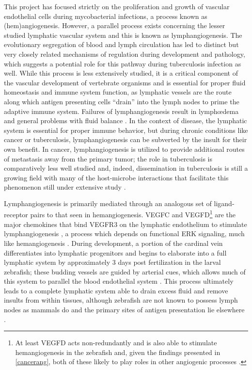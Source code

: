 This project has focused strictly on the proliferation and growth of vascular endothelial cells during mycobacterial infections, a process known as (hem)angiogenesis. However, a parallel process exists concerning the lesser studied lymphatic vascular system and this is known as lymphangiogenesis. The evolutionary segregation of blood and lymph circulation has led to distinct but very closely related mechanisms of regulation during development and pathology, which suggests a potential role for this pathway during tuberculosis infection as well. While this process is less extensively studied, it is a critical component of the vascular development of vertebrate organisms and is essential for proper fluid homeostasis and immune system function, as lymphatic vessels are the route along which antigen presenting cells ``drain'' into the lymph nodes to prime the adaptive immune system. Failures of lymphangiogenesis result in lymph\oe dema and general problems with fluid balance \citep{Makinen2001}. In the context of disease, the lymphatic system is essential for proper immune behavior, but during chronic conditions like cancer or tuberculosis, lymphangiogenesis can be subverted by the insult for their own benefit. In cancer, lymphangiogenesis is utilized to provide additional routes of metastasis away from the primary tumor; the role in tuberculosis is comparatively less well studied \citep{Huang2010, Augustin2009, Duong2012, Stacker2014} and, indeed, dissemination in tuberculosis is still a growing field with many of the host-microbe interactions that facilitate this phenomenon still under extensive study \citep{Saelens2022}.

Lymphangiogenesis is primarily mediated through an analogous set of ligand\hyp{}receptor pairs to that seen in hemangiogenesis. VEGFC and VEGFD\footnote{At least VEGFD acts non\hyp{}redundantly and is also able to stimulate hemangiogenesis in the zebrafish and, given the findings presented in \autoref{cancerang}, both of these likely to play roles in other angiogenic processes \citep{Bower2017a}.} are the major  chemokines that bind VEGFR3 on the lymphatic endothelium to stimulate lymphangiogenesis \citep{Alitalo2005, Kuchler2006, Haiko2008}, a process which depends on functional ERK signaling, much like hemangiogenesis \citep{Shin2017, Shin2016}. During development, a portion of the cardinal vein differentiates into lymphatic progenitors \citep{Yaniv2006, Nicenboim2015} and begins to elaborate into a full lymphatic system by approximately 3 days post fertilization in the larval zebrafish; these budding vessels are guided by arterial cues, which allows much of this system to parallel the blood endothelial system \citep{Jung2017, Bussmann2010}. This process ultimately leads to a complete lymphatic system able to drain excess fluid and remove insults from within tissues, although zebrafish are not known to possess lymph nodes as mammals do and the primary sites of antigen presentation lie elsewhere \citep{vanLessen2017, Onder2017}.

